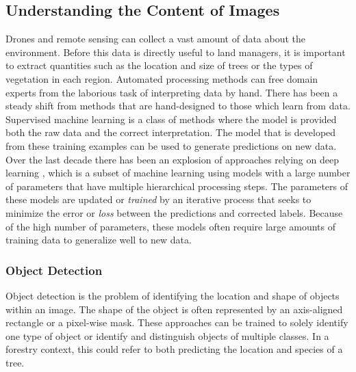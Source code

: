 \subsection{Understanding the Content of Images}
Drones and remote sensing can collect a vast amount of data about the environment. Before this data is directly useful to land managers, it is important to extract quantities such as the location and size of trees or the types of vegetation in each region. Automated processing methods can free domain experts from the laborious task of interpreting data by hand. There has been a steady shift from methods that are hand-designed to those which learn from data. Supervised machine learning is a class of methods where the model is provided both the raw data and the correct interpretation.
The model that is developed from these training examples can be used to generate predictions on new data. Over the last decade there has been an explosion of approaches relying on deep learning \cite{Lecun2015DeepLearning}, which is a subset of machine learning using models with a large number of parameters that have multiple hierarchical processing steps. 
The parameters of these models are updated or \textit{trained} by an iterative process that seeks to minimize the error or \textit{loss} between the predictions and corrected labels. Because of the high number of parameters, these models often require large amounts of training data to generalize well to new data.

\subsubsection{Object Detection}
Object detection is the problem of identifying the location and shape of objects within an image. The shape of the object is often represented by an axis-aligned rectangle or a pixel-wise mask. These approaches can be trained to solely identify one type of object or identify and distinguish objects of multiple classes. In a forestry context, this could refer to both predicting the location and species of a tree. 

